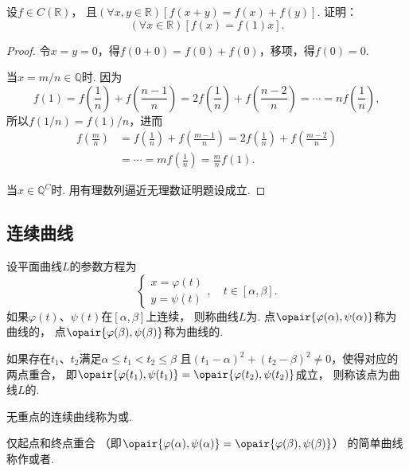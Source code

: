 \begin{example}
设\(f \in C(\mathbb{R})\)，
且\((\forall x,y\in\mathbb{R})[f(x+y) = f(x) + f(y)]\).
证明：\[
	(\forall x\in\mathbb{R})[f(x) = f(1) x].
\]
\begin{proof}
\def\f#1#2{f\left(\frac{#1}{#2}\right)}
令\(x=y=0\)，得\(f(0+0) = f(0) + f(0)\)，移项，得\(f(0) = 0\).

当\(x = m/n \in \mathbb{Q}\)时.
因为\[
	f(1) = \f{1}{n} + \f{n-1}{n}
	= 2 \f{1}{n} + \f{n-2}{n}
	= \dotsb
	= n \f{1}{n},
\]
所以\(f(1/n) = f(1) / n\)，进而\[
	\begin{split}
	\f{m}{n}
	&= \f{1}{n} + \f{m-1}{n}
	= 2 \f{1}{n} + \f{m-2}{n} \\
	&= \dotsb
	= m \f{1}{n} = \frac{m}{n} f(1).
	\end{split}
\]

当\(x \in \mathbb{Q}^C\)时.
用有理数列逼近无理数证明题设成立.
\end{proof}
\end{example}

\subsection{连续曲线}
\begin{definition}
设平面曲线\(L\)的参数方程为\[
	\left\{ \begin{array}{l}
		x = \varphi(t) \\
		y = \psi(t)
	\end{array} \right.,
	\quad
	t \in [\alpha,\beta].
\]
如果\(\varphi(t)\)、\(\psi(t)\)在\([\alpha,\beta]\)上连续，
则称曲线\(L\)为.
点\(\opair{\varphi(\alpha),\psi(\alpha)}\)称为曲线的，
点\(\opair{\varphi(\beta),\psi(\beta)}\)称为曲线的.

如果存在\(t_1\)、\(t_2\)满足\(\alpha \leq t_1 < t_2 \leq \beta\)
且\((t_1-\alpha)^2+(t_2-\beta)^2 \neq 0\)，使得对应的两点重合，
即\(\opair{\varphi(t_1),\psi(t_1)}=\opair{\varphi(t_2),\psi(t_2)}\)成立，
则称该点为曲线\(L\)的.

无重点的连续曲线称为或.

仅起点和终点重合
（即\(\opair{\varphi(\alpha),\psi(\alpha)}
=\opair{\varphi(\beta),\psi(\beta)}\)）
的简单曲线称作或者.
\end{definition}

